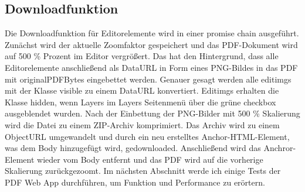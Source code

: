 \subsection{Downloadfunktion}
Die Downloadfunktion für Editorelemente wird in einer promise chain ausgeführt. Zunächst wird der aktuelle Zoomfaktor gespeichert und das PDF-Dokument wird auf 500 \% Prozent im Editor vergrößert. Das hat den Hintergrund, dass alle Editorelemente anschließend als DataURL in Form eines PNG-Bildes in das PDF mit originalPDFBytes eingebettet werden. Genauer gesagt werden alle editimgs mit der Klasse visible zu einem DataURL konvertiert. Editimgs erhalten die Klasse hidden, wenn Layers im Layers Seitenmenü über die grüne checkbox ausgeblendet wurden. Nach der Einbettung der PNG-Bilder mit 500 \% Skalierung wird die Datei zu einem ZIP-Archiv komprimiert. Das Archiv wird zu einem ObjectURL umgewandelt und durch ein neu erstelltes Anchor-HTML-Element, was dem Body hinzugefügt wird, gedownloaded. Anschließend wird das Anchror-Element wieder vom Body entfernt und das PDF wird auf die vorherige Skalierung zurückgezoomt. Im nächsten Abschnitt werde ich einige Tests der PDF Web App durchführen, um Funktion und Performance zu erörtern. 
